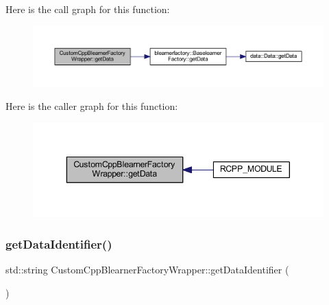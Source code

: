 Here is the call graph for this function\+:\nopagebreak
\begin{figure}[H]
\begin{center}
\leavevmode
\includegraphics[width=350pt]{class_custom_cpp_blearner_factory_wrapper_a0fa7f0c2574f895b66ddc363b5d869ad_cgraph}
\end{center}
\end{figure}
Here is the caller graph for this function\+:\nopagebreak
\begin{figure}[H]
\begin{center}
\leavevmode
\includegraphics[width=343pt]{class_custom_cpp_blearner_factory_wrapper_a0fa7f0c2574f895b66ddc363b5d869ad_icgraph}
\end{center}
\end{figure}
\mbox{\label{class_custom_cpp_blearner_factory_wrapper_a0ec23af6dd4dc8a390465d41be516983}} 
\subsubsection{\texorpdfstring{get\+Data\+Identifier()}{getDataIdentifier()}}
{\footnotesize\ttfamily std\+::string Custom\+Cpp\+Blearner\+Factory\+Wrapper\+::get\+Data\+Identifier (\begin{DoxyParamCaption}{ }\end{DoxyParamCaption})\hspace{0.3cm}{\ttfamily [inline]}}

